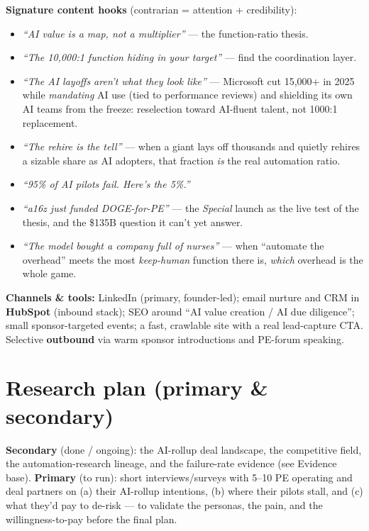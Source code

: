 \documentclass[11pt]{article}
\begin{document}
\textbf{Signature content hooks} (contrarian = attention + credibility):
\begin{itemize}
  \item \emph{``AI value is a map, not a multiplier''} --- the function-ratio thesis.
  \item \emph{``The 10{,}000:1 function hiding in your target''} --- find the coordination layer.
  \item \emph{``The AI layoffs aren't what they look like''} --- Microsoft cut 15{,}000+ in 2025
  while \emph{mandating} AI use (tied to performance reviews) and shielding its own AI teams from
  the freeze: reselection toward AI-fluent talent, not 1000:1 replacement.
  \item \emph{``The rehire is the tell''} --- when a giant lays off thousands and quietly rehires
  a sizable share as AI adopters, that fraction \emph{is} the real automation ratio.
  \item \emph{``95\% of AI pilots fail. Here's the 5\%.''}
  \item \emph{``a16z just funded DOGE-for-PE''} --- the \emph{Special} launch as the live test of
  the thesis, and the \$135B question it can't yet answer.
  \item \emph{``The model bought a company full of nurses''} --- when ``automate the overhead''
  meets the most \emph{keep-human} function there is, \emph{which} overhead is the whole game.
\end{itemize}

\textbf{Channels \& tools:} LinkedIn (primary, founder-led); email nurture and CRM in
\textbf{HubSpot} (inbound stack); SEO around ``AI value creation / AI due diligence''; small
sponsor-targeted events; a fast, crawlable site with a real lead-capture CTA. Selective
\textbf{outbound} via warm sponsor introductions and PE-forum speaking.

\section{Research plan (primary \& secondary)}
\textbf{Secondary} (done / ongoing): the AI-rollup deal landscape, the competitive field, the
automation-research lineage, and the failure-rate evidence (see Evidence base). \textbf{Primary}
(to run): short interviews/surveys with 5--10 PE operating and deal partners on (a) their
AI-rollup intentions, (b) where their pilots stall, and (c) what they'd pay to de-risk --- to
validate the personas, the pain, and the willingness-to-pay before the final plan.
\end{document}
